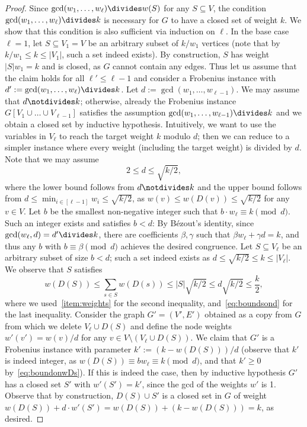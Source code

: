 \begin{proof}
Since $\gcd(w_1,\dots, w_\ell) \divides w(S)$ for any $S\subseteq V$, the condition $\gcd(w_1,\dots,w_\ell) \divides k$ is necessary for $G$ to have a closed set of weight $k$.
%
We show that this condition is also sufficient via induction on $\ell$. In the base case $\ell=1$, let $S \subseteq V_1=V$ be an arbitrary subset of $k/w_1$ vertices (note that by $k/w_1 \le k \le |V_1|$, such a set indeed exists). By construction, $S$ has weight $|S|w_1 = k$ and is closed, as $G$ cannot contain any edges.
%
Thus let us assume that the claim holds for all $\ell' \le \ell - 1$ and consider a Frobenius instance with $d':=\gcd(w_1,\dots, w_\ell) \divides k$. Let $d := \gcd(w_1,\dots,w_{\ell-1})$. We may assume that $d \notdivides k$; otherwise, already the Frobenius instance $G[V_1 \cup \dots \cup V_{\ell-1}]$ satisfies the assumption $\gcd(w_1,\dots, w_{\ell-1})\divides k$ and we obtain a closed set by inductive hypothesis.
%
Intuitively, we want to use the variables in $V_\ell$ to reach the target weight $k$ modulo $d$; then we can reduce to a simpler instance where every weight (including the target weight) is divided by $d$.
Note that we may assume 
\begin{equation}\label{eq:boundsond}
 2 \le d \le \sqrt{k/2},
 \end{equation}
where the lower bound follows from $d\notdivides k$ and the upper bound follows from $d\le \min_{i\in [\ell-1]} w_i \le \sqrt{k/2}$, as $w(v) \le w(D(v)) \le \sqrt{k/2}$ for any $v\in V$.
%
Let $b$ be the smallest non-negative integer such that $b \cdot  w_\ell \equiv k \pmod d$. Such an integer exists and satisfies $b < d$: By B\'ezout's identity, since $\gcd(w_\ell, d) = d' \divides k$, there are coefficients $\beta, \gamma$ such that $\beta w_\ell + \gamma d = k$, and thus any $b$ with $b \equiv \beta \pmod d$ achieves the desired congruence. 
%
Let $S\subseteq V_\ell$ be an arbitrary subset of size $b< d$; such a set indeed exists as $d\le \sqrt{k/2} \le k \le |V_\ell|$. We observe that $S$ satisfies
\begin{equation}\label{eq:boundonwDs}
w(D(S)) \le \sum_{s \in S} w(D(s)) \le |S| \sqrt{k/2} \le d\sqrt{k/2} \le \frac{k}{2},
\end{equation}
where we used~\ref{item:weights} for the second inequality, and~\eqref{eq:boundsond} for the last inequality. 
Consider the graph $G' = (V', E')$ obtained as a copy from $G$ from which we delete $V_\ell \cup D(S)$ and define the node weights $w'(v') = w(v)/d$ for any $v\in V\setminus (V_\ell \cup D(S))$. We claim that $G'$ is a Frobenius instance with parameter $k' := (k-w(D(S)))/d$ (observe that $k'$ is indeed integer, as $w(D(S)) \equiv b w_\ell \equiv k \pmod d$, and that $k'\ge 0$ by~\eqref{eq:boundonwDs}). If this is indeed the case, then by inductive hypothesis $G'$ has a closed set $S'$ with $w'(S') = k'$, since the gcd of the weights $w'$ is 1. Observe that by construction, $D(S)\cup S'$ is a closed set in $G$ of weight $w(D(S)) + d \cdot w'(S') = w(D(S)) + (k-w(D(S))) = k$, as desired.

\end{proof}
